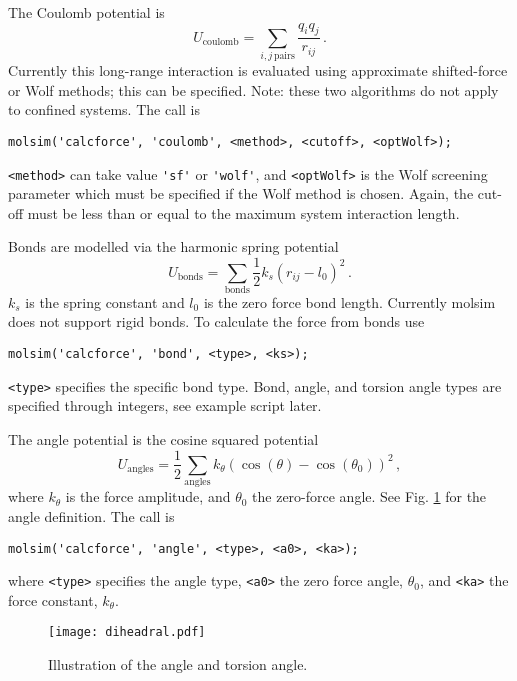 \documentclass[11pt]{article}
\begin{document}
The Coulomb potential is 
\begin{equation}
  U_{\mathrm{coulomb}} = \sum_{i,j \, \mathrm{pairs}}\frac{q_iq_j}{r_{ij}} \, .
\end{equation}
Currently this long-range interaction is evaluated using approximate
shifted-force or Wolf methods; this can be specified. Note: these two
algorithms do not apply to confined systems. The call is
\begin{verbatim}
molsim('calcforce', 'coulomb', <method>, <cutoff>, <optWolf>);
\end{verbatim}
\verb!<method>! can take value \verb!'sf'! or \verb!'wolf'!, and
\verb!<optWolf>! is the Wolf screening parameter which must be specified if the
Wolf method is chosen. Again, the cut-off must be less than or equal to the
maximum system interaction length.

Bonds are modelled via the harmonic spring potential
\begin{equation}
  U_{\mathrm{bonds}} =\sum_{\mathrm{bonds}} \frac{1}{2} k_{s}(r_{ij} - l_0)^2 \, .
\end{equation}
$k_s$ is the spring constant and $l_0$ is the zero force bond length. 
Currently \textsf{molsim} does not support rigid bonds. To calculate the force
from bonds use
\begin{verbatim}
molsim('calcforce', 'bond', <type>, <ks>);
\end{verbatim} 
\verb!<type>! specifies the specific bond type. Bond, angle, and torsion angle
types are specified through integers, see example script later. 

The angle potential is the cosine squared potential
\begin{equation}
  U_{\mathrm{angles}}=\frac{1}{2}\sum_{\mathrm{angles}} k_{\theta} (\cos(\theta) - \cos(\theta_0))^2 \, ,
\end{equation}
where $k_\theta$ is the force amplitude, and $\theta_0$ the zero-force
angle. See Fig. \ref{fig:torsion} for the angle definition. The call is
\begin{verbatim}
molsim('calcforce', 'angle', <type>, <a0>, <ka>);
\end{verbatim}
where \verb!<type>! specifies the angle type, \verb!<a0>! the zero force angle,
$\theta_0$, and \verb!<ka>! the force constant, $k_\theta$.  
\begin{figure}[h]
  \begin{center}
    \texttt{[image: diheadral.pdf]}
  \caption{
    \label{fig:torsion}
    Illustration of the angle and torsion angle.
  }
  \end{center}
\end{figure}
\end{document}
